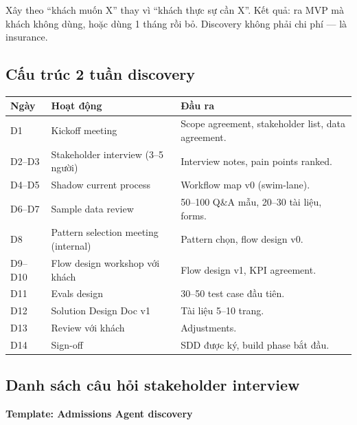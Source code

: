 \documentclass[11pt,a4paper]{article}
\begin{document}
\begin{warnbox}[title=Lỗi thường gặp nếu skip discovery]
Xây theo ``khách muốn X'' thay vì ``khách thực sự cần X''. Kết quả: ra MVP mà khách
không dùng, hoặc dùng 1 tháng rồi bỏ. Discovery không phải chi phí --- là insurance.
\end{warnbox}

\subsection{Cấu trúc 2 tuần discovery}

\begin{tabularx}{\linewidth}{@{}p{1.5cm} p{3cm} X@{}}
\toprule
\textbf{Ngày} & \textbf{Hoạt động} & \textbf{Đầu ra} \\
\midrule
D1 & Kickoff meeting & Scope agreement, stakeholder list, data agreement. \\
D2--D3 & Stakeholder interview (3--5 người) & Interview notes, pain points ranked. \\
D4--D5 & Shadow current process & Workflow map v0 (swim-lane). \\
D6--D7 & Sample data review & 50--100 Q\&A mẫu, 20--30 tài liệu, forms. \\
D8 & Pattern selection meeting (internal) & Pattern chọn, flow design v0. \\
D9--D10 & Flow design workshop với khách & Flow design v1, KPI agreement. \\
D11 & Evals design & 30--50 test case đầu tiên. \\
D12 & Solution Design Doc v1 & Tài liệu 5--10 trang. \\
D13 & Review với khách & Adjustments. \\
D14 & Sign-off & SDD được ký, build phase bắt đầu. \\
\bottomrule
\end{tabularx}

\subsection{Danh sách câu hỏi stakeholder interview}

\textbf{Template: Admissions Agent discovery}
\end{document}
